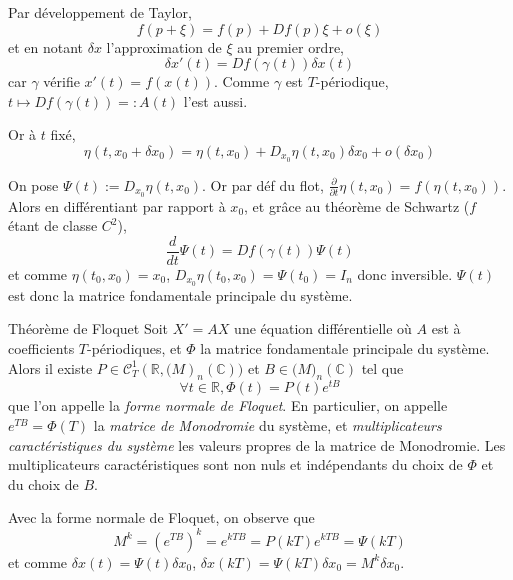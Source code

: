 \documentclass{beamer}
\begin{document}
	\begin{frame}
		
		{\small
		Par développement de Taylor,
		\begin{equation*}
			f(p + \xi) = f(p) + Df(p)\xi + o(\xi)
		\end{equation*}
		et en notant $\delta x$ l'approximation de $\xi$ au premier ordre,
		\begin{equation*}
			\delta x'(t) = Df(\gamma(t))\delta x(t)
		\end{equation*}
		car $\gamma$ vérifie $x'(t) = f(x(t))$.
		Comme $\gamma$ est $T$-périodique, $t \mapsto Df(\gamma(t)) =: A(t)$ l'est aussi.
		
		Or à $t$ fixé,
		\begin{equation*}
			\eta(t,x_0 + \delta x_0) = \eta(t,x_0) + D_{x_0}\eta(t,x_0)\delta x_0 + o(\delta x_0)
		\end{equation*}
		
		On pose $\Psi(t) := D_{x_0}\eta(t,x_0)$. Or par déf du flot, $\frac{\partial}{\partial t}\eta(t,x_0) = f(\eta(t,x_0))$. Alors en différentiant par rapport à $x_0$, et grâce au théorème de Schwartz ($f$ étant de classe $C^2$),
		\begin{equation*}
			\frac{d}{dt}\Psi(t) = Df(\gamma(t))\Psi(t)
		\end{equation*}
		et comme $\eta(t_0,x_0) = x_0$, $D_{x_0}\eta(t_0,x_0) = \Psi(t_0) = I_n$ donc inversible. $\Psi(t)$ est donc la matrice fondamentale principale du système.
		}
	\end{frame}
	
	
	\begin{frame}
		
		{\small
			
		\begin{importantresult}{Théorème de Floquet}
			Soit $X'=AX$ une équation différentielle où $A$ est à coefficients $T$-périodiques, et $\Phi$ la matrice fondamentale principale du système. Alors il existe $P \in \mathcal{C}^1_T(\mathbb{R}, \mathcal(M)_n(\mathbb{C}))$ et $B \in \mathcal(M)_n(\mathbb{C})$ tel que
			\begin{equation*}
				\forall t \in \mathbb{R}, \Phi(t) = P(t)e^{tB}
			\end{equation*}
			que l'on appelle la \textit{forme normale de Floquet}. En particulier, on appelle $e^{TB}=\Phi(T)$ la \textit{matrice de Monodromie} du système, et \textit{multiplicateurs caractéristiques du système} les valeurs propres de la matrice de Monodromie. Les multiplicateurs caractéristiques sont non nuls et indépendants du choix de $\Phi$ et du choix de $B$.
		\end{importantresult}
		
		Avec la forme normale de Floquet, on observe que
		\begin{equation*}
			M^k = (e^{TB})^k = e^{kTB} = P(kT)e^{kTB} = \Psi(kT)
		\end{equation*}
		et comme $\delta x(t) = \Psi(t)\delta x_0$, $\delta x(kT) = \Psi(kT)\delta x_0 = M^k \delta x_0$.
		}
	\end{frame}
	
\end{document}
